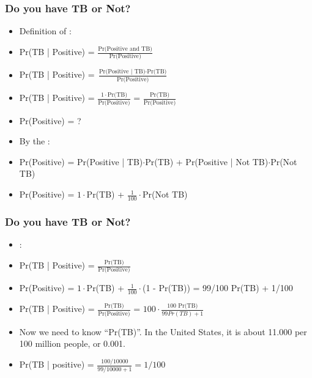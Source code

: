 \documentclass{beamer}
\begin{document}
\begin{frame}
  \frametitle{Do you have TB or Not?}

  {\large
    \begin{itemize}
    \item Definition of :
    \item Pr(TB | Positive) = $\frac{\text{Pr(Positive and TB)}}{\text{Pr(Positive)}}$
      \bigskip

    \item<2-> Pr(TB | Positive) = $\frac{\text{Pr(Positive | TB)}\cdot\text{Pr(TB)}}{\text{Pr(Positive)}}$
    \item<2-> Pr(TB | Positive) = $\frac{1\cdot\text{Pr(TB)}}{\text{Pr(Positive)}}$ = $\frac{\text{Pr(TB)}}{\text{Pr(Positive)}}$
      \bigskip

    \item<3-> Pr(Positive) = ?
    \item<3-> By the :
    \item<3-> Pr(Positive) = Pr(Positive | TB)$\cdot$Pr(TB) + Pr(Positive | Not TB)$\cdot$Pr(Not TB)
    \item<4-> Pr(Positive) = $1\cdot$Pr(TB) + $\frac{1}{100}\cdot$Pr(Not TB)
    \end{itemize}    
    
  }
\end{frame}

\begin{frame}
  \frametitle{Do you have TB or Not?}

  {\large
    \begin{itemize}
    \item {}:
    \item Pr(TB | Positive) = $\frac{\text{Pr(TB)}}{\text{Pr(Positive)}}$
      \bigskip

    \item<2-> Pr(Positive) = $1\cdot$Pr(TB) + $\frac{1}{100}\cdot$(1 - Pr(TB)) = 99/100 Pr(TB) + 1/100
    \item<3-> Pr(TB | Positive) = $\frac{\text{Pr(TB)}}{\text{Pr(Positive)}}$ = $100\cdot\frac{\text{100 Pr(TB)}}{99 Pr(TB) + 1}$
      \bigskip

    \item<3-> Now we need to know ``Pr(TB)''. In the United States, it
      is about 11.000 per 100 million people, or 0.001.
      \bigskip
      
    \item<4-> Pr(TB | positive) = $\frac{100/10000}{99/10000 + 1} = 1/100$
    \end{itemize}


  }
\end{frame}
\end{document}
